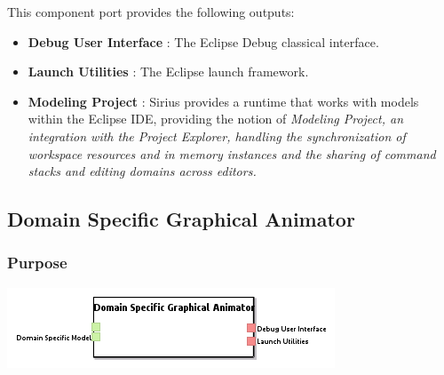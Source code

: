 \documentclass{gemoc} %
\begin{document}
This component port provides the following outputs:
\begin{itemize}
  \item \textbf{Debug User Interface} :
The Eclipse Debug classical interface.
  \item \textbf{Launch Utilities} :
The Eclipse launch framework.
  \item \textbf{Modeling Project} :
Sirius provides a runtime that works with models within the Eclipse IDE, providing the notion of \em{Modeling Project}, an integration with the Project Explorer, handling the synchronization of workspace resources and in memory instances and the sharing of command stacks and editing domains across editors.
\end{itemize}


\subsection{Domain Specific Graphical Animator}


\subsubsection{Purpose}


\begin{center}
\includegraphics*[trim=0.0cm 0.0cm 0cm 0.0cm, clip=true]{../images/generated/Generated_Domain_Specific_Graphical_Animator.png}
\end{center}
\end{document}
